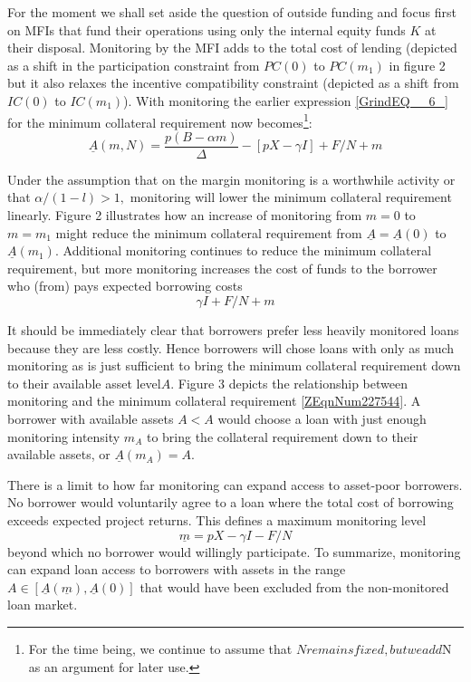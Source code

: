 \documentclass{article} %
\begin{document}
For the moment we shall set aside the question of outside funding and focus first on MFIs that fund their operations using only the internal equity funds $K$ at their disposal. Monitoring by the MFI adds to the total cost of lending (depicted as a shift in the participation constraint from $PC(0)$ to $PC(m_{1} )$ in figure 2 but it also relaxes the incentive compatibility constraint (depicted as a shift from $IC(0)$ to $IC(m_{1} )$).  With monitoring the earlier expression \eqref{GrindEQ__6_} for the minimum collateral requirement now becomes\footnote{  For the time being, we continue to assume that   $N remains fixed, but we add   $N as an argument for later use. }: 
\begin{equation} \label{ZEqnNum227544} 
\underline{A}(m,N)=\frac{p(B-\alpha m)}{\Delta } -\left[pX-\gamma I\right]+F/N+m 
\end{equation} 

Under the assumption that on the margin monitoring is a worthwhile activity or that $\alpha /(1-l)>1,$ monitoring will lower the minimum collateral requirement linearly.  Figure 2 illustrates how an increase of monitoring from $m=0$ to $m=m_{1} $ might reduce the minimum collateral requirement from $\underline{A}=\underline{A}(0)$ to $\underline{A}(m_{1} ).$ Additional monitoring continues to reduce the minimum collateral requirement, but more monitoring increases the cost of funds to the borrower who (from) pays expected borrowing costs
\[\gamma I+F/N+m\] 

It should be immediately clear that borrowers prefer less heavily monitored loans because they are less costly.  Hence borrowers will chose loans with only as much monitoring as is just sufficient to bring the minimum collateral requirement down to their available asset level$A$.  Figure 3 depicts the relationship between monitoring and the minimum collateral requirement \eqref{ZEqnNum227544}. A borrower with available assets $A<$$A$ would choose a loan with just enough monitoring intensity $m_{A} $ to bring the collateral requirement down to their available assets, or $\underline{A}(m_{A} )=A.$ 

There is a limit to how far monitoring can expand access to asset-poor borrowers.  No borrower would voluntarily agree to a loan where the total cost of borrowing exceeds expected project returns.  This defines a maximum monitoring level
\begin{equation} \label{8)} 
\underline{m}=pX-\gamma I-F/N 
\end{equation} 
beyond which no borrower would willingly participate$.$  To summarize, monitoring can expand loan access to borrowers with assets in the range $A\in [\underline{A}(\underline{m}),\underline{A}(0)]$ that would have been excluded from the non-monitored loan market. 
\end{document}
